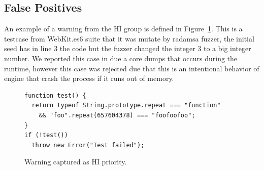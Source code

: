 \documentclass[10pt,conference,anonymous]{IEEEtran}
\begin{document}
\subsection{False Positives}

An example of a warning from the HI group is defined in Figure~\ref{fig:hi-priority}. 
This is a testcase from WebKit.es6 suite that it was mutate by radamsa fuzzer, the 
initial seed has in line 3 the code  but the fuzzer changed the 
integer 3 to a big integer number. We reported this case in \chakra{} due a core dumps that occurs
during the runtime, however this case was rejected due  that
this is an intentional behavior of engine that crash the process if it runs out of memory.

\begin{figure}[h!]
  \centering
  \scriptsize
  \begin{lstlisting}
function test() {
  return typeof String.prototype.repeat === "function"
    && "foo".repeat(657604378) === "foofoofoo";
}
if (!test())
  throw new Error("Test failed");
  \end{lstlisting}
  \normalsize
  \caption{Warning captured as HI priority.}
  \label{fig:hi-priority}
  \end{figure}
\end{document}

